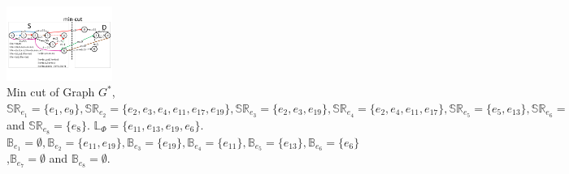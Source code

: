 \begin{figure}[tp]
  \centering
  \includegraphics[width=1.35in]{franz/MinCutStarGraph}
  \caption{Min cut of Graph $G^*$, $\mathbb{SR}_{e_1}=\{e_1, e_9\},\mathbb{SR}_{e_2}=\{e_2,e_3,e_4, e_{11},e_{17},e_{19}\},\mathbb{SR}_{e_3}=\{e_2,e_3, e_{19}\},\mathbb{SR}_{e_4}=\{e_2,e_4, e_{11},e_{17}\},\mathbb{SR}_{e_5}=\{e_5, e_{13}\},\mathbb{SR}_{e_6}=\{e_6\},\mathbb{SR}_{e_7}=\{e_7\} $ and $\mathbb{SR}_{e_8}=\{e_8\}$. $\mathbb{L}_{\Phi}=\{e_{11},e_{13},e_{19},e_{6}\}$. $\mathbb{B}_{e_1}=\emptyset,\mathbb{B}_{e_2}=\{e_{11},e_{19}\},\mathbb{B}_{e_3}=\{e_{19}\},\mathbb{B}_{e_4}=\{e_{11}\},\mathbb{B}_{e_5}=\{e_{13}\},\mathbb{B}_{e_6}=\{e_6\}$,$\mathbb{B}_{e_7}=\emptyset$ and $\mathbb{B}_{e_8}=\emptyset$. }\label{fig:MinCutStarGraph}
  \label{fig:MinCutStarGraph}
\end{figure}

